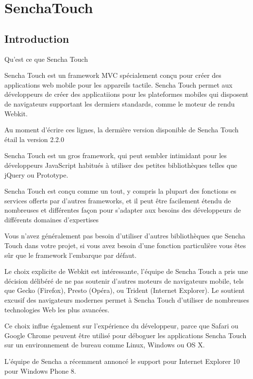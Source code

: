 \chapter{SenchaTouch}
\label{ch:senchaTouch}

\section*{Introduction}

Qu’est ce que Sencha Touch

Sencha Touch est un framework MVC spécialement conçu pour créer des applications web mobile pour les appareils tactile. Sencha Touch permet aux développeurs de créer des applicatiions pour les plateformes mobiles qui disposent de navigateurs supportant les dermiers standards, comme le moteur de rendu Webkit.

Au moment d’écrire ces lignes, la dermière version disponible de Sencha Touch étail la version 2.2.0

Sencha Touch est un gros framework, qui peut sembler intimidant pour les développeurs JavaScript habitués à utiliser des petites bibliothèques telles que jQuery ou Prototype.

Sencha Touch est conçu comme un tout, y compris la plupart des fonctions es services offerts par d’autres frameworks, et il peut être facilement étendu de nombreuses et différentes façon pour s’adapter aux besoins des développeurs de différents domaines d’expertises

Vous n’avez généralement pas besoin d’utiliser d’autres bibliothèques que Sencha Touch dans votre projet, si vous avez besoin d’une fonction particulière vous êtes sûr que le framework l’embarque par défaut.

Le choix explicite de Webkit est intéressante, l’équipe de Sencha Touch a pris une décision délibéré de ne pas soutenir d’autres moteurs de navigateurs mobile, tels que Gecko (Firefox), Presto (Opéra), ou Trident (Internet Explorer). Le soutient excusif des navigateurs modernes permet à Sencha Touch d’utiliser de nombreuses technologies Web les plus avancées.

Ce choix influe également sur l’expérience du développeur, parce que Safari ou Google Chrome peuvent être utilisé pour déboguer les applications Sencha Touch sur un environnement de bureau comme Linux, Windows ou OS X.

L’équipe de Sencha a récemment annoncé le support pour Internet Explorer 10 pour Windows Phone 8.

